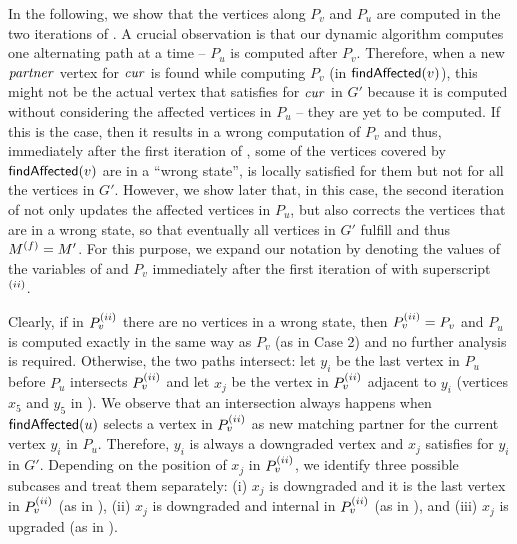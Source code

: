 In the following, we show that the vertices along $P_v$ and $P_u$ are computed
in the two iterations of .
A crucial observation is that our dynamic algorithm computes one alternating
path at a time -- $P_u$ is computed after $P_v$.
Therefore, when a new $\mathit{partner}$ vertex for $\mathit{cur}$ is found while computing $P_v$
(\ie in $\textsf{findAffected}(v)$), this might not be the actual vertex that satisfies
 for $\mathit{cur}$ in $G'$ because it is computed without
considering the affected vertices in $P_u$ -- they are yet to be computed.
If this is the case, then it results in a wrong computation of $P_v$ and thus,
immediately after the first iteration of ,
some of the vertices covered by $\textsf{findAffected}(v)$ are in a \enquote{wrong state}, \ie
{} is locally satisfied for them but not for all the vertices in $G'$.
However, we show later that, in this case, the second iteration of
 not only updates the affected vertices in $P_u$,
but also corrects the vertices that are in a wrong state, so that eventually all
vertices in $G'$ fulfill  and thus $M^{(f)} = M'$. For this
purpose, we expand our notation by denoting the values of the variables of
\suitor and $P_v$ immediately after the first iteration of
 with superscript $^{(ii)}$.

Clearly, if in $P_v^{(ii)}$ there are no vertices in a wrong state, then
$P_v^{(ii)} = P_v$ and $P_u$ is computed exactly in the same way as $P_v$ (as
in Case 2) and no further analysis is
required. Otherwise, the two paths intersect: let $y_i$ be the last vertex in
$P_u$ before $P_u$ intersects $P_v^{(ii)}$ and let $x_j$ be the vertex in
$P_v^{(ii)}$ adjacent to $y_i$ (\eg vertices $x_5$ and $y_5$ in
). We observe that an intersection always happens when
$\textsf{findAffected}(u)$ selects a vertex in $P_v^{(ii)}$ as new matching partner for the
current vertex $y_i$ in $P_u$. Therefore, $y_i$ is always a downgraded vertex
and $x_j$ satisfies  for $y_i$ in $G'$. Depending on the
position of $x_j$ in $P_v^{(ii)}$, we identify three possible subcases and treat
them separately: (i) $x_j$ is downgraded and it is the last vertex in
$P_v^{(ii)}$ (as in ), (ii) $x_j$ is downgraded and
internal in $P_v^{(ii)}$ (as in ), and (iii) $x_j$ is
upgraded (as in ).

